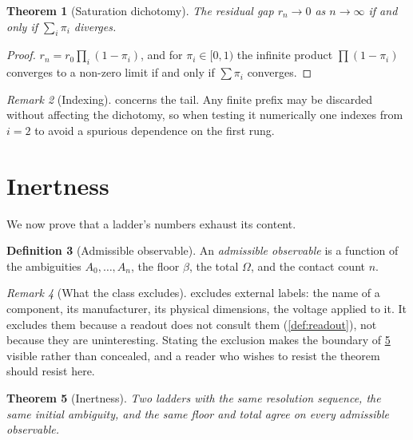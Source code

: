 \documentclass[11pt,a4paper]{article}
\theoremstyle{plain}
\newtheorem{theorem}{Theorem}[section]
\theoremstyle{definition}
\newtheorem{definition}[theorem]{Definition}
\theoremstyle{remark}
\newtheorem{remark}[theorem]{Remark}
\newcommand{\flo}{\beta}
\newcommand{\pow}{\pi}
\newcommand{\gap}{r}
\newcommand{\Tot}{\Omega}
\newcommand{\Amb}{A}
\begin{document}
\begin{theorem}[Saturation dichotomy]
\label{thm:saturation}
The residual gap $\gap_n \to 0$ as $n \to \infty$ if and only if
$\sum_i \pow_i$ diverges.
\end{theorem}

\begin{proof}
$\gap_n = \gap_0\prod_i(1-\pow_i)$, and for $\pow_i \in [0,1)$ the infinite
product $\prod(1-\pow_i)$ converges to a non-zero limit if and only if
$\sum \pow_i$ converges.
\end{proof}

\begin{remark}[Indexing]
\label{rem:tail}
 concerns the tail. Any finite prefix may be discarded
without affecting the dichotomy, so when testing it numerically one indexes from
$i = 2$ to avoid a spurious dependence on the first rung.
\end{remark}

\section{Inertness}
\label{sec:inertness}

We now prove that a ladder's numbers exhaust its content.

\begin{definition}[Admissible observable]
\label{def:observable}
An \emph{admissible observable} is a function of the ambiguities
$\Amb_0,\dots,\Amb_n$, the floor $\flo$, the total $\Tot$, and the contact count
$n$.
\end{definition}

\begin{remark}[What the class excludes]
\label{rem:obsclass}
 excludes external labels: the name of a component, its
manufacturer, its physical dimensions, the voltage applied to it. It excludes
them because a readout does not consult them (\cref{def:readout}), not because
they are uninteresting. Stating the exclusion makes the boundary of
\cref{thm:inertness} visible rather than concealed, and a reader who wishes to
resist the theorem should resist here.
\end{remark}

\begin{theorem}[Inertness]
\label{thm:inertness}
Two ladders with the same resolution sequence, the same initial ambiguity, and
the same floor and total agree on every admissible observable.
\end{theorem}
\end{document}
